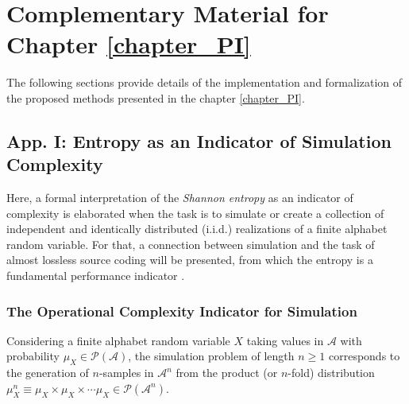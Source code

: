 \clearpage
\chapter{Complementary Material for Chapter \ref{chapter_PI}}
\label{appendix_GOBLAL_PI}


The following sections provide details of the implementation and formalization of the proposed methods presented in the chapter \ref{chapter_PI}.

\section{App. I: Entropy as an Indicator of Simulation Complexity}
\label{app_sec_entropy_for_simulations_PI}
Here, a formal interpretation of the {\em Shannon entropy} as an indicator of complexity is elaborated when the task is to simulate or create a collection of independent and identically distributed (i.i.d.) realizations of a finite alphabet random variable. 
For that, a connection between simulation and the task of almost lossless source coding \citep[Chaps. 3.2 \& 3.3]{cover_2006} will be presented, from which the entropy is a fundamental performance indicator \citep{shannon_1948,cover_2006}.

\subsection{The Operational Complexity Indicator for Simulation}
Considering a finite alphabet random variable $X$ taking values in $\mathcal{A}$ with probability $\mu_X\in \mathcal{P}(\mathcal{A})$, the simulation problem of length $n\geq 1$ corresponds to the generation of $n$-samples in $\mathcal{A}^n$ from the product (or $n$-fold) distribution $\mu_X^n \equiv \mu_X\times\mu_X\times\cdots \mu_X\in \mathcal{P}(\mathcal{A}^n)$. 


